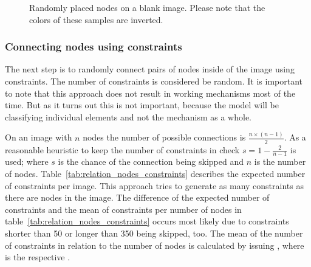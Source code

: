 \begin{figure}
\begin{subfigure}[b]{0.19\textwidth}
    \end{subfigure}
    \begin{subfigure}[b]{0.19\textwidth}
    \end{subfigure}
    \caption[Randomly placed nodes on blank image]{Randomly placed nodes on a blank image. Please note that the colors of these samples are inverted. }\label{fig:constraint_data_step1}
\end{figure}

\subsubsection{Connecting nodes using constraints}

The next step is to randomly connect pairs of nodes inside of the image using constraints.
The number of constraints is considered be random.
It is important to note that this approach does not result in working mechanisms most of the time.
But as it turns out this is not important, because the model will be classifying individual elements and not the mechanism as a whole.

On an image with \(n\) nodes the number of possible connections is \(\frac{n \times (n-1)}{2}\).
As a reasonable heuristic to keep the number of constraints in check \(s = 1 - \frac{2}{n-1}\) is used; where \(s\) is the chance of the connection being skipped and \(n\) is the number of nodes.
Table~\ref{tab:relation_nodes_constraints} describes the expected number of constraints per image.
This approach tries to generate as many constraints as there are nodes in the image.
The difference of the expected number of constraints and the mean of constraints per number of nodes in table~\ref{tab:relation_nodes_constraints} occurs most likely due to constraints shorter than 50 or longer than 350 being skipped, too.
The mean of the number of constraints in relation to the number of nodes is calculated by issuing , where  is the respective .

